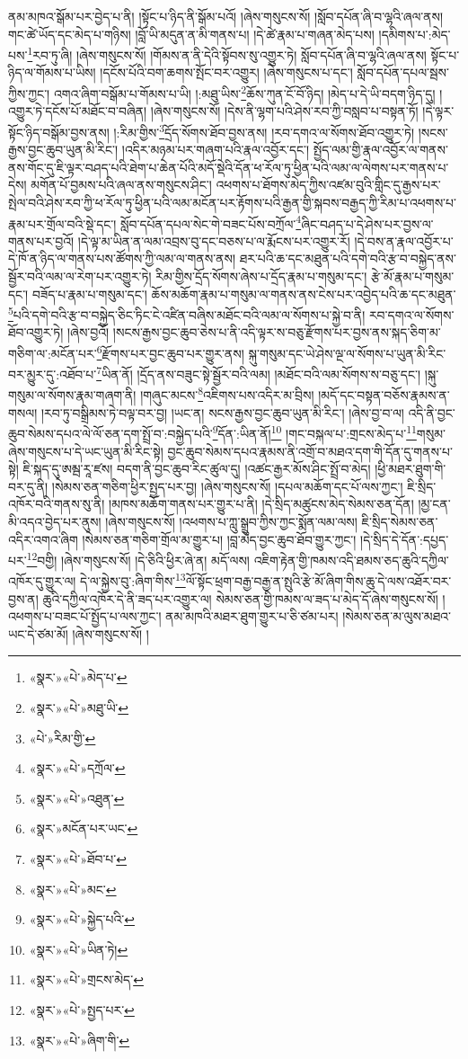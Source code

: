 ནམ་མཁའ་སྒོམ་པར་བྱེད་པ་ནི། །སྟོང་པ་ཉིད་ནི་སྒོམ་པའོ། །ཞེས་གསུངས་སོ། །སློབ་དཔོན་ཞི་བ་ལྷའི་ཞལ་ནས། གང་ཚེ་ཡོད་དང་མེད་པ་གཉིས། །བློ་ཡི་མདུན་ན་མི་གནས་པ། །དེ་ཚེ་རྣམ་པ་གཞན་མེད་པས། །དམིགས་པ་:མེད་པས་\footnote{«སྣར་»«པེ་»མེད་པ་}རབ་ཏུ་ཞི། །ཞེས་གསུངས་སོ། །གོམས་ན་ནི་དེའི་སྟོབས་སུ་འགྱུར་ཏེ། སློབ་དཔོན་ཞི་བ་ལྷའི་ཞལ་ནས། སྟོང་པ་ཉིད་ལ་གོམས་པ་ཡིས། །དངོས་པོའི་བག་ཆགས་སྤོང་བར་འགྱུར། །ཞེས་གསུངས་པ་དང་། སློབ་དཔོན་དཔལ་སྦས་ཀྱིས་ཀྱང་། འགའ་ཞིག་བསྒོམ་པ་གོམས་པ་ཡི། །:མཐུ་ཡིས་\footnote{«སྣར་»«པེ་»མཐུ་ཡི་}ཆོས་ཀུན་ངོ་བོ་ཉིད། །མེད་པ་དེ་ཡི་བདག་ཉིད་དུ། །འགྱུར་ཏེ་དངོས་པོ་མཐོང་བ་བཞིན། །ཞེས་གསུངས་སོ། །དེས་ནི་ལྷག་པའི་ཤེས་རབ་ཀྱི་བསླབ་པ་བསྟན་ཏོ། །དེ་ལྟར་སྟོང་ཉིད་བསྒོམ་བྱས་ནས། །:རིམ་གྱིས་\footnote{«པེ་»རིམ་གྱི་}དྲོད་སོགས་ཐོབ་བྱས་ནས། །རབ་དགའ་ལ་སོགས་ཐོབ་འགྱུར་ཏེ། །སངས་རྒྱས་བྱང་ཆུབ་ཡུན་མི་རིང་། །འདིར་མཉམ་པར་གཞག་པའི་རྣལ་འབྱོར་དང་། སྤྱོད་ལམ་གྱི་རྣལ་འབྱོར་ལ་གནས་ནས་གོང་དུ་ཇི་ལྟར་བཤད་པའི་ཐེག་པ་ཆེན་པོའི་མདོ་སྡེའི་དོན་ཕ་རོལ་ཏུ་ཕྱིན་པའི་ལམ་ལ་ལེགས་པར་གནས་པ་དེས། མགོན་པོ་བྱམས་པའི་ཞལ་ནས་གསུངས་ཤིང་། འཕགས་པ་ཐོགས་མེད་ཀྱིས་འཛམ་བུའི་གླིང་དུ་རྒྱས་པར་སྤེལ་བའི་ཤེས་རབ་ཀྱི་ཕ་རོལ་ཏུ་ཕྱིན་པའི་ལམ་མངོན་པར་རྟོགས་པའི་རྒྱན་གྱི་སྐབས་བརྒྱད་ཀྱི་རིམ་པ་འཕགས་པ་རྣམ་པར་གྲོལ་བའི་སྡེ་དང་། སློབ་དཔོན་དཔལ་སེང་གེ་བཟང་པོས་བཀྲོལ་\footnote{«སྣར་»«པེ་»དཀྲོལ་}ཞིང་བཤད་པ་དེ་ཤེས་པར་བྱས་ལ་གནས་པར་བྱའོ། །དེ་ལྟ་མ་ཡིན་ན་ལམ་འབྲས་བུ་དང་བཅས་པ་ལ་རྨོངས་པར་འགྱུར་རོ། །དེ་བས་ན་རྣལ་འབྱོར་པ་དེ་ཁོ་ན་ཉིད་ལ་གནས་པས་ཚོགས་ཀྱི་ལམ་ལ་གནས་ནས། ཐར་པའི་ཆ་དང་མཐུན་པའི་དགེ་བའི་རྩ་བ་བསྐྱེད་ནས་སྦྱོར་བའི་ལམ་ལ་རེག་པར་འགྱུར་ཏེ། རིམ་གྱིས་དྲོད་སོགས་ཞེས་པ་དྲོད་རྣམ་པ་གསུམ་དང་། རྩེ་མོ་རྣམ་པ་གསུམ་དང་། བཟོད་པ་རྣམ་པ་གསུམ་དང་། ཆོས་མཆོག་རྣམ་པ་གསུམ་ལ་གནས་ནས་ངེས་པར་འབྱེད་པའི་ཆ་དང་མཐུན་\footnote{«སྣར་»«པེ་»འཐུན་}པའི་དགེ་བའི་རྩ་བ་བསྐྱེད་ཅིང་ཏིང་ངེ་འཛིན་བཞིས་མཐོང་བའི་ལམ་ལ་སོགས་པ་སྐྱེ་བ་ནི། རབ་དགའ་ལ་སོགས་ཐོབ་འགྱུར་ཏེ། །ཞེས་བྱའོ། །སངས་རྒྱས་བྱང་ཆུབ་ཅེས་པ་ནི་འདི་ལྟར་ས་བཅུ་རྫོགས་པར་བྱས་ནས་སྐད་ཅིག་མ་གཅིག་ལ་:མངོན་པར་\footnote{«སྣར་»མངོན་པར་ཡང་}རྫོགས་པར་བྱང་ཆུབ་པར་གྱུར་ནས། སྐུ་གསུམ་དང་ཡེ་ཤེས་ལྔ་ལ་སོགས་པ་ཡུན་མི་རིང་བར་མྱུར་དུ་:འཐོབ་པ་\footnote{«སྣར་»«པེ་»ཐོབ་པ་}ཡིན་ནོ། །དྲོད་ནས་བཟུང་སྟེ་སྦྱོར་བའི་ལམ། །མཐོང་བའི་ལམ་སོགས་ས་བཅུ་དང་། །སྐུ་གསུམ་ལ་སོགས་རྣམ་གཞག་ནི། །གཞུང་མངས་\footnote{«སྣར་»«པེ་»མང་}འཇིགས་པས་འདིར་མ་བྲིས། །མདོ་དང་བསྟན་བཅོས་རྣམས་ན་གསལ། །རབ་ཏུ་བསྒྲིམས་ཏེ་བལྟ་བར་བྱ། །ཡང་ན། སངས་རྒྱས་བྱང་ཆུབ་ཡུན་མི་རིང་། །ཞེས་བྱ་བ་ལ། འདི་ནི་བྱང་ཆུབ་སེམས་དཔའ་ལེ་ལོ་ཅན་དག་སྤྲོ་བ་:བསྐྱེད་པའི་\footnote{«སྣར་»«པེ་»སྐྱེད་པའི་}དོན་:ཡིན་ནོ།\footnote{«སྣར་»«པེ་»ཡིན་ཏེ།} །གང་བསྐལ་པ་:གྲངས་མེད་པ་\footnote{«སྣར་»«པེ་»གྲངས་མེད་}གསུམ་ཞེས་གསུངས་པ་དེ་ཡང་ཡུན་མི་རིང་སྟེ། བྱང་ཆུབ་སེམས་དཔའ་རྣམས་ནི་འགྲོ་བ་མཐའ་དག་གི་དོན་དུ་གནས་པ་སྟེ། ཇི་སྐད་དུ་ཨམྦ་རཱ་ཛས། བདག་ནི་བྱང་ཆུབ་རིང་ཚུལ་དུ། །འཚང་རྒྱར་མོས་ཤིང་སྤྲོ་བ་མེད། །ཕྱི་མཐར་ཐུག་གི་བར་དུ་ནི། །སེམས་ཅན་གཅིག་ཕྱིར་སྤྱད་པར་བྱ། །ཞེས་གསུངས་སོ། །དཔལ་མཆོག་དང་པོ་ལས་ཀྱང་། ཇི་སྲིད་འཁོར་བའི་གནས་སུ་ནི། །མཁས་མཆོག་གནས་པར་གྱུར་པ་ནི། །དེ་སྲིད་མཚུངས་མེད་སེམས་ཅན་དོན། །མྱ་ངན་མི་འདའ་བྱེད་པར་ནུས། །ཞེས་གསུངས་སོ། །འཕགས་པ་ཀླུ་སྒྲུབ་ཀྱིས་ཀྱང་སྨོན་ལམ་ལས། ཇི་སྲིད་སེམས་ཅན་འདིར་འགའ་ཞིག །སེམས་ཅན་གཅིག་གྲོལ་མ་གྱུར་པ། །བླ་མེད་བྱང་ཆུབ་ཐོབ་གྱུར་ཀྱང་། །དེ་སྲིད་དེ་དོན་:དཔྱད་པར་\footnote{«སྣར་»«པེ་»སྤྱད་པར་}བགྱི། །ཞེས་གསུངས་སོ། །དེ་ཅིའི་ཕྱིར་ཞེ་ན། མདོ་ལས། འཇིག་རྟེན་གྱི་ཁམས་འདི་ཐམས་ཅད་ཆུའི་དཀྱིལ་འཁོར་དུ་གྱུར་ལ། དེ་ལ་སྐྱེས་བུ་:ཞིག་གིས་\footnote{«སྣར་»«པེ་»ཞིག་གི་}ལོ་སྟོང་ཕྲག་བརྒྱ་བརྒྱ་ན་སྤུའི་རྩེ་མོ་ཞིག་གིས་ཆུ་དེ་ལས་འཐོར་བར་བྱས་ན། ཆུའི་དཀྱིལ་འཁོར་དེ་ནི་ཟད་པར་འགྱུར་ལ། སེམས་ཅན་གྱི་ཁམས་ལ་ཟད་པ་མེད་དོ་ཞེས་གསུངས་སོ། །འཕགས་པ་བཟང་པོ་སྤྱོད་པ་ལས་ཀྱང་། ནམ་མཁའི་མཐར་ཐུག་གྱུར་པ་ཅི་ཙམ་པར། །སེམས་ཅན་མ་ལུས་མཐའ་ཡང་དེ་ཙམ་མོ། །ཞེས་གསུངས་སོ། །

